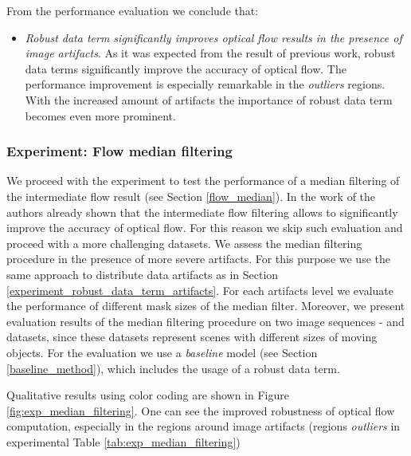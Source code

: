 From the  performance evaluation we conclude that:
\begin{itemize}
	\item \textit{Robust data term significantly improves optical flow results in the presence of image artifacts}. As it was expected from the result of previous work, robust data terms  significantly improve the accuracy of optical flow. The performance improvement is especially remarkable in the \textit{outliers} regions. With the increased amount of artifacts the importance of robust data term becomes even more prominent. 
\end{itemize}


\subsubsection{Experiment: Flow median filtering}
\label{exp_flow_median}

We proceed with the experiment to test the performance of a median filtering of the intermediate flow result (see Section \ref{flow_median}). In the work of \cite{Sun10, Sun14} the authors already shown that the intermediate flow filtering allows to significantly improve the accuracy of optical flow. For this reason we skip such evaluation and proceed with a more challenging datasets. We assess the median filtering procedure in the presence of more severe artifacts. For this purpose we use the same approach to distribute data artifacts as in Section \ref{experiment_robust_data_term_artifacts}. For each artifacts level we evaluate the performance of different mask sizes of the median filter. Moreover, we present evaluation results of the median filtering procedure on two image sequences - \rub and \hyd datasets, since these datasets represent scenes with different sizes of moving objects. For the evaluation we use a \textit{baseline} model (see Section \ref{baseline_method}), which includes the usage of a robust data term.

Qualitative results using color coding are shown in Figure \ref{fig:exp_median_filtering}. One can see the improved robustness of optical flow computation, especially in the regions around image artifacts (regions \textit{outliers} in experimental Table \ref{tab:exp_median_filtering})   

\newcommand{\imageSizeb}{0.33}

